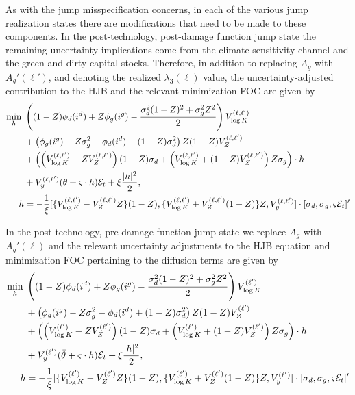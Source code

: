 \documentclass[12pt]{article}
\begin{document}
\begin{appendices}
As with the jump misspecification concerns, in each of the various jump realization states there are modifications that need to be made to these components. In the post-technology, post-damage function jump state the remaining uncertainty implications come from the climate sensitivity channel and the green and dirty capital stocks. Therefore, in addition to replacing $A_g$ with $A_g'(\ell')$, and denoting the realized $\lambda_3(\ell)$ value, the uncertainty-adjusted contribution to the HJB and the relevant minimization FOC are given by
\begin{equation*}
\begin{split}
\min_{h} \hspace{0.1cm} & \left((1-Z)\phi_d(i^{d}) +Z \phi_g(i^{g}) -\frac{   \sigma_d^2 (1-Z)^2 + \sigma_g^2 Z^2 }{2} \right)V^{(\ell,\ell')}_{\log K} \\
 & +\left( \phi_g(i^{g}) - Z \sigma_g^2 - \phi_d(i^{d}) + (1-Z) \sigma_d^2  \right) Z (1-Z) V^{(\ell,\ell')}_{Z}\\
 & + \left( \left( V^{(\ell,\ell')}_{\log K} -  Z V^{(\ell,\ell')}_{Z} \right) (1-Z) \sigma_d  + \left( V^{(\ell,\ell')}_{\log K} + (1-Z) V^{(\ell,\ell')}_{Z} \right)  Z \sigma_g \right) \cdot h \\
 & +  V^{(\ell,\ell')}_{y} (\bar{\theta} + \varsigma \cdot h) \mathcal{E}_t + \xi \frac{|h|^2}{2}, \\
h & = -\frac{1}{\xi}[\{V^{(\ell,\ell')}_{\log K}-V^{(\ell,\ell')}_{Z}Z\}(1-Z),\{V^{(\ell,\ell')}_{\log K}+V^{(\ell,\ell')}_{Z}(1-Z)\}Z,V^{(\ell,\ell')}_{y}]  \cdot[\sigma_{d},\sigma_{g},\varsigma \mathcal{E}_t]'   
\end{split}
\end{equation*}


In the post-technology, pre-damage function jump state we replace $A_g$ with $A_g'(\ell)$ and the relevant uncertainty adjustments to the HJB equation and minimization FOC pertaining to the diffusion terms are given by
\begin{equation*}
\begin{split}
\min_{h} \hspace{0.1cm} & \left((1-Z) \phi_d(i^{d})+Z \phi_g(i^{g}) -\frac{   \sigma_d^2 (1-Z)^2 + \sigma_g^2 Z^2 }{2} \right)V^{(\ell')}_{\log K} \\
 & +\left( \phi_g(i^{g}) - Z \sigma_g^2 - \phi_d(i^{d}) + (1-Z) \sigma_d^2  \right) Z (1-Z) V^{(\ell')}_{Z}\\
 & + \left( \left( V^{(\ell')}_{\log K} -  Z V^{(\ell')}_{Z} \right) (1-Z) \sigma_d  + \left( V^{(\ell')}_{\log K} + (1-Z) V^{(\ell')}_{Z} \right)  Z \sigma_g \right) \cdot h \\
 & + V^{(\ell')}_{y} (\bar{\theta} + \varsigma \cdot h) \mathcal{E}_t + \xi \frac{|h|^2}{2}, \\
 h & = -\frac{1}{\xi}[\{V^{(\ell')}_{\log K}-V^{(\ell')}_{Z}Z\}(1-Z),\{V^{(\ell')}_{\log K}+V^{(\ell')}_{Z}(1-Z)\}Z,V^{(\ell')}_{y}]  \cdot[\sigma_{d},\sigma_{g},\varsigma \mathcal{E}_t]'  
\end{split}
\end{equation*}


\end{appendices}
\end{document}
